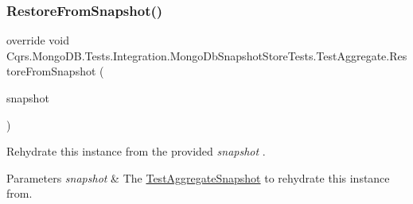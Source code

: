 \mbox{\label{classCqrs_1_1MongoDB_1_1Tests_1_1Integration_1_1MongoDbSnapshotStoreTests_1_1TestAggregate_aa1d4be82ca1c195882f36578a551dfb2_aa1d4be82ca1c195882f36578a551dfb2}} 
\subsubsection{\texorpdfstring{Restore\+From\+Snapshot()}{RestoreFromSnapshot()}}
{\footnotesize\ttfamily override void Cqrs.\+Mongo\+D\+B.\+Tests.\+Integration.\+Mongo\+Db\+Snapshot\+Store\+Tests.\+Test\+Aggregate.\+Restore\+From\+Snapshot (\begin{DoxyParamCaption}\item[{\hyperlink{classCqrs_1_1MongoDB_1_1Tests_1_1Integration_1_1MongoDbSnapshotStoreTests_1_1TestAggregateSnapshot}{Test\+Aggregate\+Snapshot}}]{snapshot }\end{DoxyParamCaption})\hspace{0.3cm}{\ttfamily [protected]}}



Rehydrate this instance from the provided {\itshape snapshot} . 


\begin{DoxyParams}{Parameters}
{\em snapshot} & The \hyperlink{classCqrs_1_1MongoDB_1_1Tests_1_1Integration_1_1MongoDbSnapshotStoreTests_1_1TestAggregateSnapshot}{Test\+Aggregate\+Snapshot} to rehydrate this instance from.\\
\hline
\end{DoxyParams}


